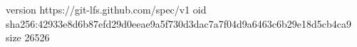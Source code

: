 version https://git-lfs.github.com/spec/v1
oid sha256:42933e8d6b87efd29d0eeae9a5f730d3dac7a7f04d9a6463c6b29e18d5cb4ca9
size 26526
